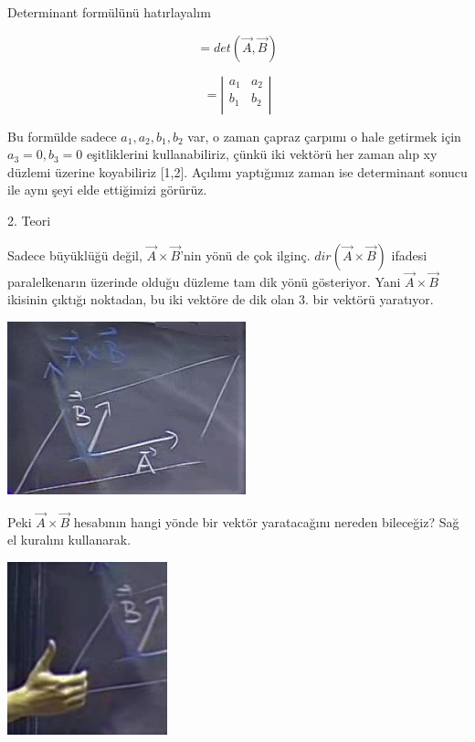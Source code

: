 \documentclass[12pt,fleqn]{article}\usepackage{../../common}
\begin{document}
Determinant formülünü hatırlayalım

$$ = det(\vec{A},\vec{B}) $$

$$ =
\left|\begin{array}{rr}
a_1 & a_2 \\
b_1 & b_2 \\
\end{array}\right|
 $$

Bu formülde sadece $a_1,a_2,b_1,b_2$ var, o zaman çapraz çarpımı o hale getirmek
için $a_3=0,b_3=0$ eşitliklerini kullanabiliriz, çünkü iki vektörü her zaman
alıp xy düzlemi üzerine koyabiliriz [1,2]. Açılımı yaptığımız zaman ise
determinant sonucu ile aynı şeyi elde ettiğimizi görürüz.

2. Teori

Sadece büyüklüğü değil, $\vec{A} \times \vec{B}$'nin yönü de çok
ilginç. $dir(\vec{A} \times \vec{B})$ ifadesi paralelkenarın üzerinde olduğu
düzleme tam dik yönü gösteriyor. Yani $\vec{A} \times \vec{B}$ ikisinin çıktığı
noktadan, bu iki vektöre de dik olan 3. bir vektörü yaratıyor.

\begin{center}
\includegraphics[height=5cm]{2_10.png}
\end{center}

Peki $\vec{A} \times \vec{B}$ hesabının hangi yönde bir vektör yaratacağını
nereden bileceğiz? Sağ el kuralını kullanarak.

\begin{center}
\includegraphics[height=5cm]{2_11.png}
\end{center}
\end{document}
